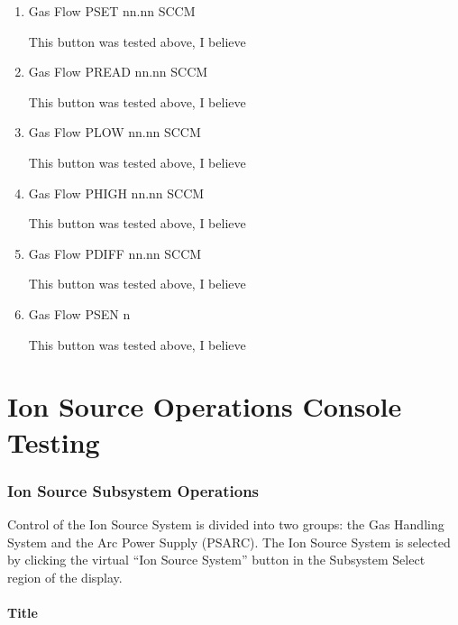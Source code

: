 \documentclass[11pt]{book}		%
\begin{document}
\begin{enumerate}
 \item Gas Flow PSET   nn.nn SCCM

\color{red}
This button was tested above, I believe
\color{black}

 \item Gas Flow PREAD  nn.nn SCCM

\color{red}
This button was tested above, I believe
\color{black}

 \item Gas Flow PLOW   nn.nn SCCM

\color{red}
This button was tested above, I believe
\color{black}

 \item Gas Flow PHIGH  nn.nn SCCM

\color{red}
This button was tested above, I believe
\color{black}

 \item Gas Flow PDIFF  nn.nn SCCM

\color{red}
This button was tested above, I believe
\color{black}

 \item Gas Flow PSEN   n

\color{red}
This button was tested above, I believe
\color{black}

\end{enumerate}



\chapter{Ion Source Operations Console Testing}

\subsection{Ion Source Subsystem Operations}

Control of the Ion Source System is divided into two groups: the Gas Handling System and the Arc Power Supply (PSARC).  The Ion Source System is selected by clicking the virtual ``Ion Source System'' button in the Subsystem Select region of the display.

\subsubsection{Title} \label{sect:cyc-op-interface-ops-terminal-subsys-ops-source-title}
\end{document}

